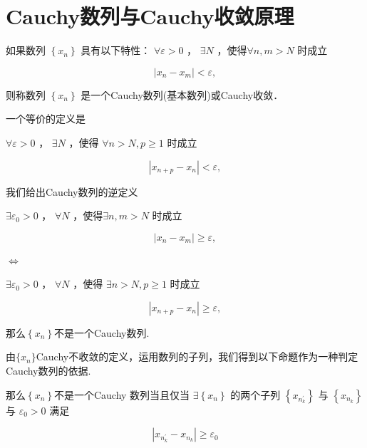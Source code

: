 \section{Cauchy数列与Cauchy收敛原理}
\begin{definition}
	如果数列 $\left\{x_n\right\}$ 具有以下特性： $\forall\varepsilon>0$ ， $\exists N$ ，使得$\forall n, m>N$ 时成立
	
	$$
	\left|x_n-x_m\right|<\varepsilon,
	$$
	
	
	则称数列 $\left\{x_n\right\}$ 是一个Cauchy数列(基本数列)或Cauchy收敛．
	
	一个等价的定义是
	
	$\forall\varepsilon>0$ ， $\exists N$ ，使得 $\forall n>N,p\geqslant1$ 时成立
	
	$$
	\left|x_{n+p}-x_n\right|<\varepsilon,
	$$
\end{definition}
我们给出Cauchy数列的逆定义
\begin{definition}
	$\exists\varepsilon_0>0$ ， $\forall N$ ，使得$\exists n, m>N$ 时成立
	
	$$
	\left|x_n-x_m\right|\geqslant\varepsilon,
	$$
	
	$\Leftrightarrow$
	
	$\exists\varepsilon_0>0$ ， $\forall N$ ，使得 $\exists n>N,p\geqslant1$ 时成立
	
	$$
	\left|x_{n+p}-x_n\right|\geqslant\varepsilon,
	$$
	
	那么$\left\{x_n\right\}$不是一个Cauchy数列.
\end{definition}
由\(\{x_n\}\)Cauchy不收敛的定义，运用数列的子列，我们得到以下命题作为一种判定Cauchy数列的依据.
\begin{proposition}
	那么$\left\{x_n\right\}$不是一个Cauchy 数列当且仅当 $\exists\left\{x_n\right\}$ 的两个子列 $\left\{x_{n^{\prime}_k}\right\}$ 与 $\left\{x_{n_ k}\right\}$ 与 $\varepsilon_0>0$ 满足
	
	$$
	\left|x_{n_k^{\prime}}-x_{n_k}\right| \geqslant \varepsilon_0
	$$
\end{proposition}

